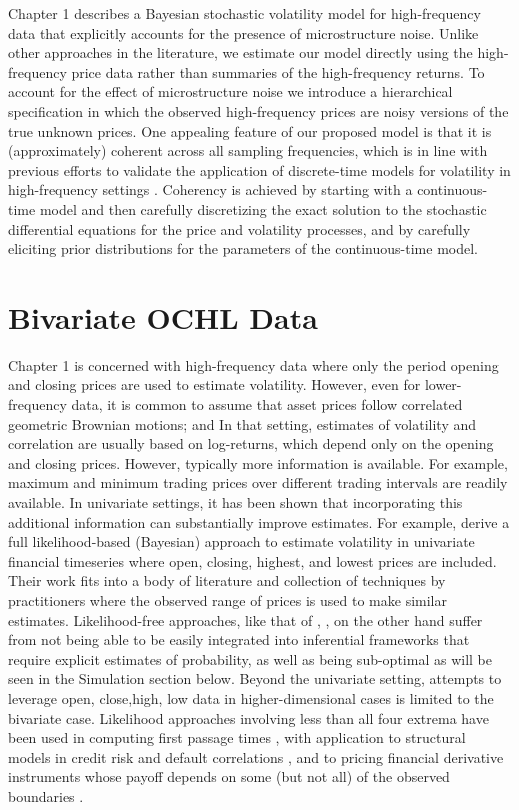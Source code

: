 Chapter 1 describes a Bayesian stochastic volatility model for
high-frequency data that explicitly accounts for the presence of
microstructure noise.  Unlike other approaches in the literature, we
estimate our model directly using the high-frequency price data rather
than summaries of the high-frequency returns.  To account for the
effect of microstructure noise we introduce a hierarchical
specification in which the observed high-frequency prices are noisy
versions of the true unknown prices.  One appealing feature of our
proposed model is that it is (approximately) coherent across all
sampling frequencies, which is in line with previous efforts to
validate the application of discrete-time models for volatility in
high-frequency settings \cite{andersen1999forecasting}.  Coherency is
achieved by starting with a continuous-time model and then carefully
discretizing the exact solution to the stochastic differential
equations for the price and volatility processes, and by carefully
eliciting prior distributions for the parameters of the
continuous-time model.

\section{Bivariate OCHL Data}
Chapter 1 is concerned with high-frequency data where only the period
opening and closing prices are used to estimate volatility. However,
even for lower-frequency data, it is common to assume that asset
prices follow correlated geometric Brownian motions; and In that
setting, estimates of volatility and correlation are usually based on
log-returns, which depend only on the opening and closing prices.
However, typically more information is available.  For example,
maximum and minimum trading prices over different trading intervals
are readily available.  In univariate settings, it has been shown that
incorporating this additional information can substantially improve
estimates. For example, \cite{rodriguez2012} derive a full
likelihood-based (Bayesian) approach to estimate volatility in
univariate financial timeseries where open, closing, highest, and
lowest prices are included. Their work fits into a body of literature
and collection of techniques by practitioners where the observed range
of prices is used to make similar estimates. Likelihood-free
approaches, like that of \cite{rogers1991estimating},
\cite{rogers2008estimating}, on the other hand suffer from not being
able to be easily integrated into inferential frameworks that require
explicit estimates of probability, as well as being sub-optimal as
will be seen in the Simulation section below. Beyond the univariate
setting, attempts to leverage open, close,high, low data in
higher-dimensional cases is limited to the bivariate case. Likelihood
approaches involving less than all four extrema have been used in
computing first passage times \cite{kou2016first, sacerdote2016first},
with application to structural models in credit risk and default
correlations \cite{haworth2008modelling, ching2014correlated}, and to
pricing financial derivative instruments whose payoff depends on some
(but not all) of the observed boundaries \cite{he1998double}.

